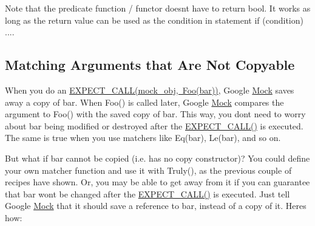 Note that the predicate function / functor doesn\textquotesingle{}t have to return {\ttfamily bool}. It works as long as the return value can be used as the condition in statement {\ttfamily if (condition) ...}.

\subsection*{Matching Arguments that Are Not Copyable}

When you do an {\ttfamily \mbox{\hyperlink{_obj__test_2lib_2googletest-release-1_88_81_2googlemock_2include_2gmock_2gmock-spec-builders_8h_a535a6156de72c1a2e25a127e38ee5232}{E\+X\+P\+E\+C\+T\+\_\+\+C\+A\+L\+L(mock\+\_\+obj, Foo(bar))}}}, Google \mbox{\hyperlink{class_mock}{Mock}} saves away a copy of {\ttfamily bar}. When {\ttfamily Foo()} is called later, Google \mbox{\hyperlink{class_mock}{Mock}} compares the argument to {\ttfamily Foo()} with the saved copy of {\ttfamily bar}. This way, you don\textquotesingle{}t need to worry about {\ttfamily bar} being modified or destroyed after the {\ttfamily \mbox{\hyperlink{googletest-master_2googlemock_2include_2gmock_2gmock-spec-builders_8h_a535a6156de72c1a2e25a127e38ee5232}{E\+X\+P\+E\+C\+T\+\_\+\+C\+A\+L\+L()}}} is executed. The same is true when you use matchers like {\ttfamily Eq(bar)}, {\ttfamily Le(bar)}, and so on.

But what if {\ttfamily bar} cannot be copied (i.\+e. has no copy constructor)? You could define your own matcher function and use it with {\ttfamily Truly()}, as the previous couple of recipes have shown. Or, you may be able to get away from it if you can guarantee that {\ttfamily bar} won\textquotesingle{}t be changed after the {\ttfamily \mbox{\hyperlink{googletest-master_2googlemock_2include_2gmock_2gmock-spec-builders_8h_a535a6156de72c1a2e25a127e38ee5232}{E\+X\+P\+E\+C\+T\+\_\+\+C\+A\+L\+L()}}} is executed. Just tell Google \mbox{\hyperlink{class_mock}{Mock}} that it should save a reference to {\ttfamily bar}, instead of a copy of it. Here\textquotesingle{}s how\+:


\begin{DoxyCode}{0}
\DoxyCodeLine{}
\end{DoxyCode}


